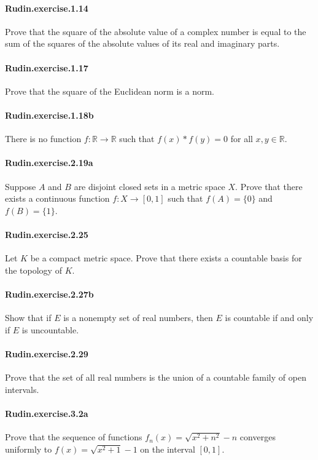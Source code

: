 \documentclass{article}
\begin{document}
{\paragraph{Rudin.exercise.1.14} Prove that the square of the absolute value of a complex number is equal to the sum of the squares of the absolute values of its real and imaginary parts.

\paragraph{Rudin.exercise.1.17} Prove that the square of the Euclidean norm is a norm.

\paragraph{Rudin.exercise.1.18b} There is no function $f : ℝ → ℝ$ such that $f(x) * f(y) = 0$ for all $x, y \in ℝ$.

\paragraph{Rudin.exercise.2.19a} Suppose $A$ and $B$ are disjoint closed sets in a metric space $X$. Prove that there exists a continuous function $f : X → [0, 1]$ such that $f(A) = \{0\}$ and $f(B) = \{1\}$.

\paragraph{Rudin.exercise.2.25} Let $K$ be a compact metric space. Prove that there exists a countable basis for the topology of $K$.

\paragraph{Rudin.exercise.2.27b} Show that if $E$ is a nonempty set of real numbers, then $E$ is countable if and only if $E$ is uncountable.

\paragraph{Rudin.exercise.2.29} Prove that the set of all real numbers is the union of a countable family of open intervals.

\paragraph{Rudin.exercise.3.2a} Prove that the sequence of functions $f_n(x) = \sqrt{x^2 + n^2} - n$ converges uniformly to $f(x) = \sqrt{x^2 + 1} - 1$ on the interval $[0, 1]$.

}
\end{document}
